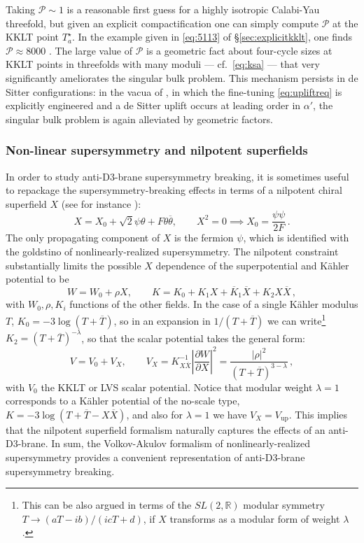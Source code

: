 \documentclass[12pt,a4wide]{article}
\def\be{\begin{equation}}
\def\ee{\end{equation}}
\begin{document}
Taking $\mathcal{P} \sim 1$ is a reasonable first guess for a highly isotropic Calabi-Yau threefold, but given an explicit compactification one can simply compute $\mathcal{P}$ at the KKLT point $T_a^{\star}$.  In the example given in \eqref{eq:5113} of \S\ref{sec:explicitkklt}, one finds $\mathcal{P} \approx 8000$ \cite{Demirtas:2021nlu}.  The large value of $\mathcal{P}$ is a geometric fact about four-cycle sizes at KKLT points in threefolds with many moduli --- cf.~\eqref{eq:ksa} --- that very significantly ameliorates the singular bulk problem.  This mechanism persists in de Sitter configurations: in the vacua of \cite{coni}, in which the fine-tuning  \eqref{eq:upliftreq} is explicitly engineered and a de Sitter uplift occurs at leading order in $\alpha'$, the singular bulk problem is again alleviated by geometric factors.

\subsubsection{Non-linear supersymmetry and nilpotent superfields} 

In order to study anti-D3-brane supersymmetry breaking, it is sometimes useful to repackage the
supersymmetry-breaking effects 
in terms of a nilpotent chiral superfield $X$
(see for instance \cite{Ferrara:2014kva,Kallosh:2014wsa,Bergshoeff:2015jxa, Kallosh:2015nia}):
\be
X=X_0+\sqrt{2}\psi\theta+F\theta \overline \theta, \qquad X^2=0 \implies X_0=\frac{\psi\psi}{2F}\,.
\ee
The only propagating component of $X$ is the fermion $\psi$,
which is identified with the goldstino of nonlinearly-realized supersymmetry.  The nilpotent constraint substantially limits the possible $X$ dependence of the superpotential and K\"ahler potential to be
\be
W=W_0+\rho X, \qquad K=K_0+K_1 X+\overline{K}_1\overline X+K_2 X\overline X\,,
\ee
with $W_0, \rho, K_i$ functions of the other fields. In the case of a single K\"ahler modulus $T$, $ K_0=-3\log \left(T+\overline T\right)$, so in an expansion in $1/\left(T+\overline T \right)$ we can write\footnote{This can be also argued in terms of the $SL(2,\mathbb R)$ modular symmetry 
$T \rightarrow \left(aT-ib\right)/\left(icT+d\right)$, if $X$ transforms as a modular form of  weight $\lambda$.} 
$K_2=\left( T+\overline T\right)^{-\lambda}$, so that
the scalar potential takes the general form:
\be
V=V_0+V_X, \qquad V_X=K^{-1}_{X\overline X}\left |\frac{\partial W}{\partial X}\right |^2=\frac{\left |\rho \right |^2}{\left(T + \overline T \right)^{3-\lambda}}\,,
\ee
with $V_0$ the KKLT or LVS scalar potential. 
Notice that modular weight $\lambda =1$ corresponds to a K\"ahler potential of the no-scale type, $K=-3\log \left(T+\overline T -X\overline X\right)$, and also for $\lambda =1$ we have $V_X=V_{\text{up}}$. This implies that the nilpotent superfield formalism naturally captures the effects of an anti-D3-brane. 
In sum, the Volkov-Akulov formalism of nonlinearly-realized supersymmetry provides a convenient representation of anti-D3-brane supersymmetry breaking.
 
\end{document}
